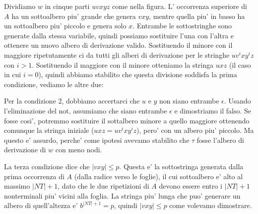 {Dividiamo $ w $ in cinque parti $ uvxyz $ come nella figura. L' occorrenza superiore di $ A $ ha un sottoalbero piu' grande che genera $ vxy $, mentre quella piu' in basso ha un sottoalbero piu' piccolo e genera solo $ x $. Entrambe le sottostringhe sono generate dalla stessa variabile, quindi possiamo sostituire l'una con l'altra e ottenere un nuovo albero di derivazione valido. Sostituendo il minore con il maggiore ripetutamente ci da tutti gli alberi di derivazione per le stringhe $ uv^ixy^iz $ con $ i > 1 $. Sostituendo il maggiore con il minore otteniamo la stringa $ uxz $ (il caso in cui $ i = 0 $), quindi abbiamo stabilito che questa divisione soddisfa la prima condizione, vediamo le altre due:

Per la condizione 2, dobbiamo accertarci che $ u $ e $ y $ non siano entrambe $ \epsilon $. Usando l'eliminazione del not, assumiamo che siano entrambe $ \epsilon $ e dimostriamo il falso. Se fosse cosi', potremmo sostituire il sottalbero minore a quello maggiore ottenendo comunque la stringa iniziale ($ uxz = uv^ixy^iz $), pero' con un albero piu' piccolo. Ma questo e' assurdo, perche' come ipotesi avevamo stabilito che $ \tau $ fosse l'albero di derivazione di $ w $ con meno nodi. 

La terza condizione dice che $ |vxy| \leq p $. Questa e' la sottostringa generata dalla prima occorrenza di $ A $ (dalla radice verso le foglie), il cui sottoalbero e' alto al massimo $ |NT| + 1 $, dato che le due ripetizioni di $ A $ devono essere entro i $ |NT|+1 $ nonterminali piu' vicini alla foglia. La stringa piu' lunga che puo' generare un albero di quell'altezza e' $ b^{|NT|+1} = p $, quindi $ |vxy| \leq p $ come volevamo dimostrare.
}

